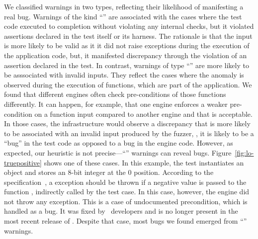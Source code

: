 \documentclass[10pt,conference,anonymous]{IEEEtran}
\begin{document}
We classified warnings in two types, reflecting their likelihood of
manifesting a real bug. Warnings of the kind ``\hi{}'' are associated
with the cases where the test code executed to completion without
violating any internal checks, but it violated assertions declared in
the test itself or its harness. The rationale is that the input is
more likely to be valid as it it did not raise exceptions during the
execution of the application code, but, it manifested discrepancy
through the violation of an assertion declared in the test. In
contrast, warnings of type ``\lo{}'' are more likely to be asssociated
with invalid inputs. They reflect the cases where the anomaly is
observed during the execution of functions, which are part of the
application. We found that different engines often check
pre-conditions of those functions differently. It can happen, for
example, that one engine enforces a weaker pre-condition on a function
input compared to another engine and that is acceptable. In those
cases, the infrastructure would observe a discrepancy that is more
likely to be associated with an invalid input produced by the fuzzer,
\ie{}, it is likely to be a ``bug'' in the test code as opposed to a
bug in the engine code. However, as expected, our heuristic is not
precise---``\lo'' warnings can reveal
bugs. Figure~\ref{fig:lo-truepositive} shows one of these cases. In
this example, the test instantiates an  object and
stores an 8-bit integer at the 0 position. According to the
specification~\cite{ecmas262-getviewvalue}, a 
exception should be thrown if a negative value is passed to the
function , indirectly called by the test case. In this
case, however, the \chakra{} engine did not throw any exception. This
is a case of undocumented precondition, which is handled as a bug. It
was fixed by \chakra\ developers and is no longer present in the most
recent release of \chakra. Despite that case, most bugs we found
emerged from ``\hi{}'' warnings.

\end{document}
